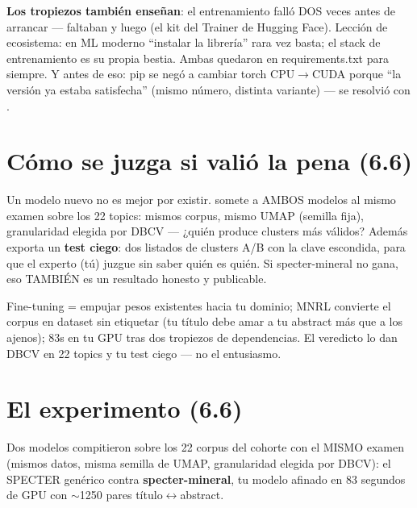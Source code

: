 \documentclass[11pt,a4paper]{article}
\begin{document}
\begin{ojo}
\textbf{Los tropiezos también enseñan}: el entrenamiento falló DOS veces antes de arrancar —
faltaban  y luego  (el kit del Trainer de Hugging Face).
Lección de ecosistema: en ML moderno ``instalar la librería'' rara vez basta; el stack de
entrenamiento es su propia bestia. Ambas quedaron en requirements.txt para siempre.
Y antes de eso: pip se negó a cambiar torch CPU$\rightarrow$CUDA porque ``la versión ya
estaba satisfecha'' (mismo número, distinta variante) — se resolvió con
.
\end{ojo}

\section{Cómo se juzga si valió la pena (6.6)}

Un modelo nuevo no es mejor por existir.  somete a AMBOS modelos
al mismo examen sobre los 22 topics: mismos corpus, mismo UMAP (semilla fija), granularidad
elegida por DBCV — ¿quién produce clusters más válidos? Además exporta un \textbf{test
ciego}: dos listados de clusters A/B con la clave escondida, para que el experto (tú)
juzgue sin saber quién es quién. Si specter-mineral no gana, eso TAMBIÉN es un resultado
honesto y publicable.

\begin{resumen}
Fine-tuning = empujar pesos existentes hacia tu dominio; MNRL convierte el corpus en
dataset sin etiquetar (tu título debe amar a tu abstract más que a los ajenos); 83s en tu
GPU tras dos tropiezos de dependencias. El veredicto lo dan DBCV en 22 topics y tu test
ciego — no el entusiasmo.
\end{resumen}
\clearpage
{}
{}

\section{El experimento (6.6)}

Dos modelos compitieron sobre los 22 corpus del cohorte con el MISMO examen (mismos datos,
misma semilla de UMAP, granularidad elegida por DBCV): el SPECTER genérico contra
\textbf{specter-mineral}, tu modelo afinado en 83 segundos de GPU con $\sim$1250 pares
título$\leftrightarrow$abstract.
\end{document}
